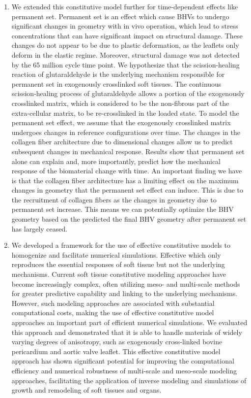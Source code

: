 \begin{enumerate}
        \item We extended this constitutive model further for time-dependent effects like permanent set. Permanent set is an effect which cause BHVs to undergo significant changes in geometry with in vivo operation, which lead to stress concentrations that can have significant impact on structural damage. These changes do not appear to be due to plastic deformation, as the leaflets only deform in the elastic regime. Moreover, structural damage was not detected by the 65 million cycle time point. We hypothesize that the scission-healing reaction of glutaraldehyde is the underlying mechanism responsible for permanent set in exogenously crosslinked soft tissues. The continuous scission-healing process of glutaraldehyde allows a portion of the exogenously crosslinked matrix, which is considered to be the non-fibrous part of the extra-cellular matrix, to be re-crosslinked in the loaded state. To model the permanent set effect, we assume that the exogenously crosslinked matrix undergoes changes in reference configurations over time. The changes in the collagen fiber architecture due to dimensional changes allow us to predict subsequent changes in mechanical response. Results show that permanent set alone can explain and, more importantly, predict how the mechanical response of the biomaterial change with time. An important finding we have is that the collagen fiber architecture has a limiting effect on the maximum changes in geometry that the permanent set effect can induce. This is due to the recruitment of collagen fibers as the changes in geometry due to permanent set increase. This means we can potentially optimize the BHV geometry based on the predicted the final BHV geometry after permanent set has largely ceased. 
        \item We developed a framework for the use of effective constitutive models to homogenize and facilitate numerical simulations. Effective which only reproduces the essential responses of soft tissue but not the underlying mechanisms. Current soft tissue constitutive modeling approaches have become increasingly complex, often utilizing meso- and multi-scale methods for greater predictive capability and linking to the underlying mechanisms. However, such modeling approaches are associated with substantial computational costs, making the use of effective constitutive model approaches an important part of efficient numerical simulations. We evaluated this approach and demonstrated that it is able to handle materials of widely varying degrees of anisotropy, such as exogenously cross-linked bovine pericardium and aortic valve leaflet. This effective constitutive model approach has shown significant potential for improving the computational efficiency and numerical robustness of multi-scale and meso-scale modeling approaches, facilitating the application of inverse modeling and simulations of growth and remodeling of soft tissues and organs.

\end{enumerate}
